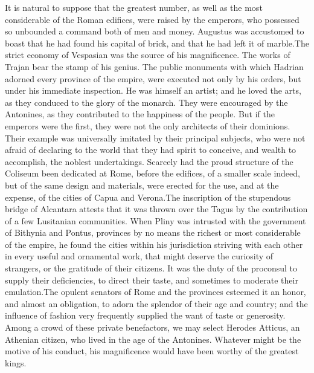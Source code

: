 It is natural to suppose that the greatest number, as well as the
most considerable of the Roman edifices, were raised by the
emperors, who possessed so unbounded a command both of men and
money. Augustus was accustomed to boast that he had found his
capital of brick, and that he had left it of marble.\footnotemark[64] The
strict economy of Vespasian was the source of his magnificence.
The works of Trajan bear the stamp of his genius. The public
monuments with which Hadrian adorned every province of the
empire, were executed not only by his orders, but under his
immediate inspection. He was himself an artist; and he loved the
arts, as they conduced to the glory of the monarch. They were
encouraged by the Antonines, as they contributed to the happiness
of the people. But if the emperors were the first, they were not
the only architects of their dominions. Their example was
universally imitated by their principal subjects, who were not
afraid of declaring to the world that they had spirit to
conceive, and wealth to accomplish, the noblest undertakings.
Scarcely had the proud structure of the Coliseum been dedicated
at Rome, before the edifices, of a smaller scale indeed, but of
the same design and materials, were erected for the use, and at
the expense, of the cities of Capua and Verona.\footnotemark[65] The
inscription of the stupendous bridge of Alcantara attests that it
was thrown over the Tagus by the contribution of a few Lusitanian
communities. When Pliny was intrusted with the government of
Bithynia and Pontus, provinces by no means the richest or most
considerable of the empire, he found the cities within his
jurisdiction striving with each other in every useful and
ornamental work, that might deserve the curiosity of strangers,
or the gratitude of their citizens. It was the duty of the
proconsul to supply their deficiencies, to direct their taste,
and sometimes to moderate their emulation.\footnotemark[66] The opulent
senators of Rome and the provinces esteemed it an honor, and
almost an obligation, to adorn the splendor of their age and
country; and the influence of fashion very frequently supplied
the want of taste or generosity. Among a crowd of these private
benefactors, we may select Herodes Atticus, an Athenian citizen,
who lived in the age of the Antonines. Whatever might be the
motive of his conduct, his magnificence would have been worthy of
the greatest kings.


